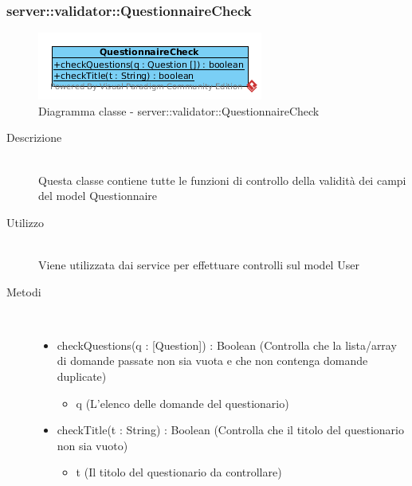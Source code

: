 \subsubsection[QuestionnaireCheck]{server::validator::QuestionnaireCheck}
\begin{center}
			\begin{figure}[H]
				\centering \includegraphics[scale=4, max width=\textwidth, max height=\myheight]{../img/diagrammiClassi/server/validator/QuestionnaireCheck.png}
				\caption{Diagramma classe - server::validator::QuestionnaireCheck}
			\end{figure}
		\end{center}\begin{description}
\item[Descrizione] \hfill \\
 Questa classe contiene tutte le funzioni di controllo della validità dei campi del model Questionnaire
\item[Utilizzo] \hfill \\
 Viene utilizzata dai service per effettuare controlli sul model User
\item[Metodi] \hfill \\
 \vspace{-7mm}
\begin{itemize}
\item checkQuestions(q : [Question]) : Boolean (Controlla che la lista/array di domande passate non sia vuota e che non contenga domande duplicate)\begin{itemize}
\item q (L'elenco delle domande del questionario)
\end{itemize}

\item checkTitle(t : String) : Boolean (Controlla che il titolo del questionario non sia vuoto)\begin{itemize}
\item t (Il titolo del questionario da controllare)
\end{itemize}

\end{itemize}

\end{description}

